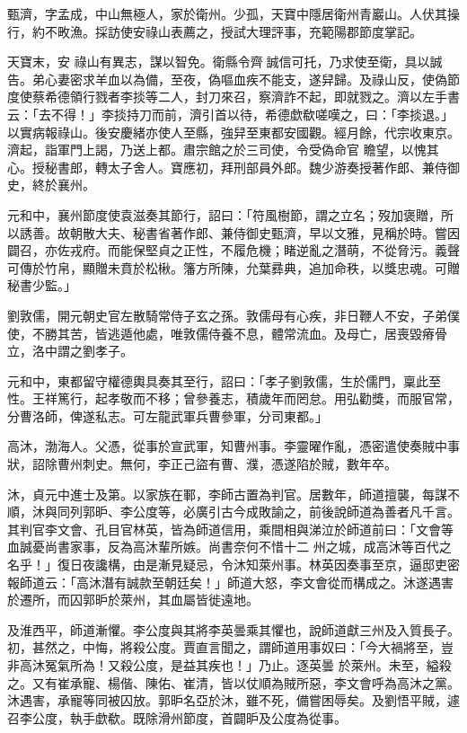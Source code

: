 \begin{pinyinscope}
 甄濟，字孟成，中山無極人，家於衛州。少孤，天寶中隱居衛州青巖山。人伏其操行，約不畋漁。採訪使安祿山表薦之，授試大理評事，充範陽郡節度掌記。



 天寶末，安
 祿山有異志，謀以智免。衛縣令齊誠信可托，乃求使至衛，具以誠告。弟心妻密求羊血以為備，至夜，偽嘔血疾不能支，遂舁歸。及祿山反，使偽節度使蔡希德領行戮者李掞等二人，封刀來召，察濟詐不起，即就戮之。濟以左手書云：「去不得！」李掞持刀而前，濟引首以待，希德歔欷嗟嘆之，曰：「李掞退。」以實病報祿山。後安慶緒亦使人至縣，強舁至東都安國觀。經月餘，代宗收東京。濟起，詣軍門上謁，乃送上都。肅宗館之於三司使，令受偽命官
 瞻望，以愧其心。授秘書郎，轉太子舍人。寶應初，拜刑部員外郎。魏少游奏授著作郎、兼侍御史，終於襄州。



 元和中，襄州節度使袁滋奏其節行，詔曰：「符風樹節，謂之立名；歿加褒贈，所以誘善。故朝散大夫、秘書省著作郎、兼侍御史甄濟，早以文雅，見稱於時。嘗因闢召，亦佐戎府。而能保堅貞之正性，不履危機；睹逆亂之潛萌，不從脅污。義聲可傳於竹帛，顯贈未賁於松楸。籓方所陳，允葉彞典，追加命秩，以獎忠魂。可贈秘書少監。」



 劉敦儒，開元朝史官左散騎常侍子玄之孫。敦儒母有心疾，非日鞭人不安，子弟僕使，不勝其苦，皆逃遁他處，唯敦儒侍養不息，體常流血。及母亡，居喪毀瘠骨立，洛中謂之劉孝子。



 元和中，東都留守權德輿具奏其至行，詔曰：「孝子劉敦儒，生於儒門，稟此至性。王祥篤行，起孝敬而不移；曾參養志，積歲年而罔怠。用弘勸獎，而服官常，分曹洛師，俾遂私志。可左龍武軍兵曹參軍，分司東都。」



 高沐，渤海人。父憑，從事於宣武軍，知曹州事。李靈曜作亂，憑密遣使奏賊中事狀，詔除曹州刺史。無何，李正己盜有曹、濮，憑遂陷於賊，數年卒。



 沐，貞元中進士及第。以家族在鄆，李師古置為判官。居數年，師道擅襲，每謀不順，沐與同列郭昈、李公度等，必廣引古今成敗諭之，前後說師道為善者凡千言。其判官李文會、孔目官林英，皆為師道信用，乘間相與涕泣於師道前曰：「文會等血誠憂尚書家事，反為高沐輩所嫉。尚書奈何不惜十二
 州之城，成高沐等百代之名乎！」復日夜讒構，由是漸見疑忌，令沐知萊州事。林英因奏事至京，逼邸吏密報師道云：「高沐潛有誠款至朝廷矣！」師道大怒，李文會從而構成之。沐遂遇害於遷所，而囚郭昈於萊州，其血屬皆徙遠地。



 及淮西平，師道漸懼。李公度與其將李英曇乘其懼也，說師道獻三州及入質長子。初，甚然之，中悔，將殺公度。賈直言聞之，謂師道用事奴曰：「今大禍將至，豈非高沐冤氣所為！又殺公度，是益其疾也！」乃止。逐英曇
 於萊州。未至，縊殺之。又有崔承寵、楊偕、陳佑、崔清，皆以仗順為賊所惡，李文會呼為高沐之黨。沐遇害，承寵等同被囚放。郭昈名亞於沐，雖不死，備嘗困辱矣。及劉悟平賊，遽召李公度，執手歔欷。既除滑州節度，首闢昈及公度為從事。




\end{pinyinscope}
